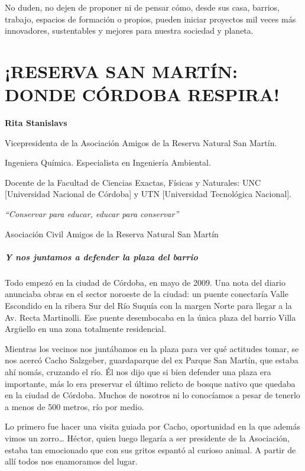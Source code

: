 \documentclass[
]{article}
\begin{document}
No duden, no dejen de proponer ni de pensar cómo, desde sus casa,
barrios, trabajo, espacios de formación o propios, pueden iniciar
proyectos mil veces más innovadores, sustentables y mejores para nuestra
sociedad y planeta.

\cleardoublepage

\hypertarget{reserva-san-martuxedn-donde-cuxf3rdoba-respira}{%
\section{¡RESERVA SAN MARTÍN: DONDE CÓRDOBA
RESPIRA!}\label{reserva-san-martuxedn-donde-cuxf3rdoba-respira}}

\textbf{Rita Stanislavs}

Vicepresidenta de la Asociación Amigos de la Reserva Natural San Martín.

Ingeniera Química. Especialista en Ingeniería Ambiental.

Docente de la Facultad de Ciencias Exactas, Físicas y Naturales: UNC
{[}Universidad Nacional de Córdoba{]} y UTN {[}Universidad Tecnológica
Nacional{]}.

\emph{``Conservar para educar, educar para conservar''}

Asociación Civil Amigos de la Reserva Natural San Martín

\hypertarget{y-nos-juntamos-a-defender-la-plaza-del-barrio}{%
\subparagraph{Y nos juntamos a defender la plaza del
barrio}\label{y-nos-juntamos-a-defender-la-plaza-del-barrio}}

Todo empezó en la ciudad de Córdoba, en mayo de 2009. Una nota del
diario anunciaba obras en el sector noroeste de la ciudad: un puente
conectaría Valle Escondido en la ribera Sur del Río Suquía con la margen
Norte para llegar a la Av. Recta Martinolli. Ese puente desembocaba en
la única plaza del barrio Villa Argüello en una zona totalmente
residencial.

Mientras los vecinos nos juntábamos en la plaza para ver qué actitudes
tomar, se nos acercó Cacho Salzgeber, guardaparque del ex Parque San
Martín, que estaba ahí nomás, cruzando el río. Él nos dijo que si bien
defender una plaza era importante, más lo era preservar el último
relicto de bosque nativo que quedaba en la ciudad de Córdoba. Muchos de
nosotros ni lo conocíamos a pesar de tenerlo a menos de 500 metros, río
por medio.

Lo primero fue hacer una visita guiada por Cacho, oportunidad en la que
además vimos un zorro\ldots{} Héctor, quien luego llegaría a ser
presidente de la Asociación, estaba tan emocionado que con sus gritos
espantó al curioso animal. A partir de allí todos nos enamoramos del
lugar.
\end{document}
